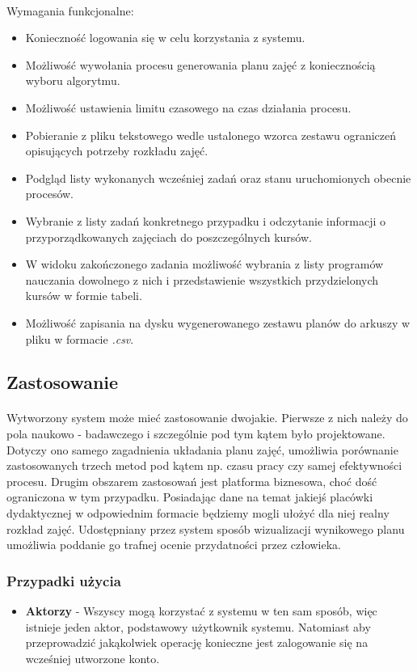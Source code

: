 \paragraph{}Wymagania funkcjonalne:
\begin{itemize}
\item Konieczność logowania się w celu korzystania z systemu.
\item Możliwość wywołania procesu generowania planu zajęć z koniecznością wyboru algorytmu.
\item Możliwość ustawienia limitu czasowego na czas działania procesu.
\item Pobieranie z pliku tekstowego wedle ustalonego wzorca zestawu ograniczeń opisujących potrzeby rozkładu zajęć.
\item Podgląd listy wykonanych wcześniej zadań oraz stanu uruchomionych obecnie procesów.
\item Wybranie z listy zadań konkretnego przypadku i odczytanie informacji o przyporządkowanych zajęciach do poszczególnych kursów.
\item W widoku zakończonego zadania możliwość wybrania z listy programów nauczania dowolnego z nich i przedstawienie wszystkich przydzielonych kursów w formie tabeli.
\item Możliwość zapisania na dysku wygenerowanego zestawu planów do arkuszy w pliku w formacie \emph{.csv}.
\end{itemize}
\subsection{Zastosowanie}
\paragraph{}Wytworzony system może mieć zastosowanie dwojakie. Pierwsze z nich należy do pola naukowo - badawczego i szczególnie pod tym kątem było projektowane. Dotyczy ono samego zagadnienia układania planu zajęć, umożliwia porównanie zastosowanych trzech metod pod kątem np. czasu pracy czy samej efektywności procesu. Drugim obszarem zastosowań jest platforma biznesowa, choć dość ograniczona w tym przypadku. Posiadając dane na temat jakiejś placówki dydaktycznej w odpowiednim formacie będziemy mogli ułożyć dla niej realny rozkład zajęć. Udostępniany przez system sposób wizualizacji wynikowego planu umożliwia poddanie go trafnej ocenie przydatności przez człowieka.
\subsubsection{Przypadki użycia}
\begin{itemize}
\item{\textbf{Aktorzy}} - Wszyscy mogą korzystać z systemu w ten sam sposób, więc istnieje jeden aktor, podstawowy użytkownik systemu. Natomiast aby przeprowadzić jakąkolwiek operację konieczne jest zalogowanie się na wcześniej utworzone konto.
\end{itemize}
